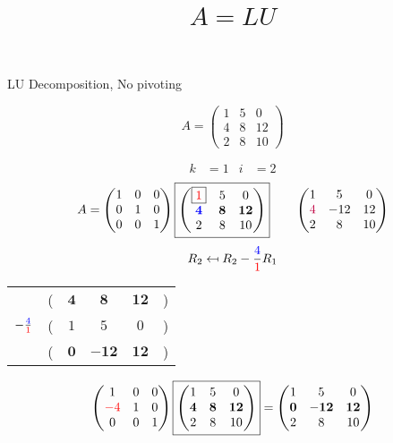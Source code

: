 \documentclass[pdf]{beamer}
\title{$A=LU$}
\subtitle{}
\author{}
\begin{document}
\begin{frame}{}
\begin{center}LU Decomposition, No pivoting\end{center} $$A = \begin{pmatrix}1&5&0\\4&8&12\\2&8&10\end{pmatrix}$$\end{frame}
\begin{frame}{}\begin{align*} k &= 1 & i &= 2 \end{align*} $$A=\begin{pmatrix}1&0&0\\0&1&0\\0&0&1\end{pmatrix} \boxed{\begin{pmatrix}\boxed{{\color{red}1}}&5&0\\\mathbf{{\color{blue}4}}&\mathbf{8}&\mathbf{12}\\2&8&10\end{pmatrix}} \quad\quad \begin{pmatrix}1&5&0\\{\color{purple}4}&-12&12\\2&8&10\end{pmatrix}$$ $$R_2 \mapsfrom R_2 - \frac{{\color{blue}4}}{{\color{red}1}} R_1$$ \begin{center}\begin{tabular}{cccccc}  &(& $ \mathbf{4} $ & $ \mathbf{8} $ & $ \mathbf{12} $ &)\\$ -\frac{{\color{blue}4}}{{\color{red}1}} $&(& $ 1 $ & $ 5 $ & $ 0 $ &)\\\hline  &(& $ \mathbf{0} $ & $ \mathbf{-12} $ & $ \mathbf{12} $ &) \end{tabular}\end{center} $$ \begin{pmatrix}1&0&0\\{\color{red}-4}&1&0\\0&0&1\end{pmatrix} \boxed{\begin{pmatrix}1&5&0\\\mathbf{4}&\mathbf{8}&\mathbf{12}\\2&8&10\end{pmatrix}} = \begin{pmatrix}1&5&0\\\mathbf{0}&\mathbf{-12}&\mathbf{12}\\2&8&10\end{pmatrix} $$\end{frame}
\end{document}
